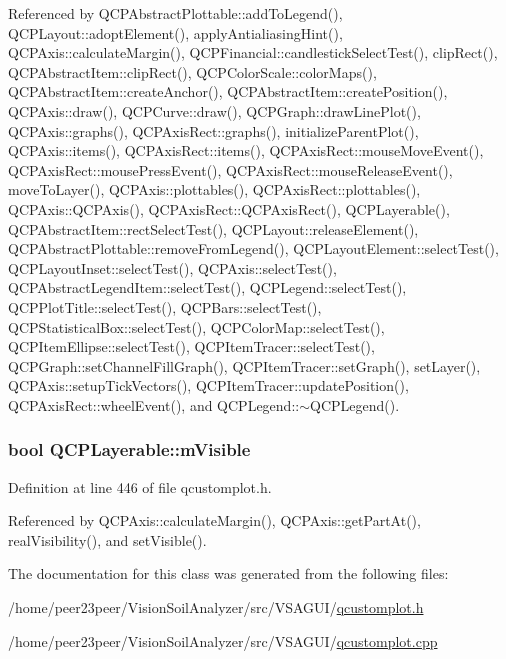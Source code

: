 Referenced by Q\+C\+P\+Abstract\+Plottable\+::add\+To\+Legend(), Q\+C\+P\+Layout\+::adopt\+Element(), apply\+Antialiasing\+Hint(), Q\+C\+P\+Axis\+::calculate\+Margin(), Q\+C\+P\+Financial\+::candlestick\+Select\+Test(), clip\+Rect(), Q\+C\+P\+Abstract\+Item\+::clip\+Rect(), Q\+C\+P\+Color\+Scale\+::color\+Maps(), Q\+C\+P\+Abstract\+Item\+::create\+Anchor(), Q\+C\+P\+Abstract\+Item\+::create\+Position(), Q\+C\+P\+Axis\+::draw(), Q\+C\+P\+Curve\+::draw(), Q\+C\+P\+Graph\+::draw\+Line\+Plot(), Q\+C\+P\+Axis\+::graphs(), Q\+C\+P\+Axis\+Rect\+::graphs(), initialize\+Parent\+Plot(), Q\+C\+P\+Axis\+::items(), Q\+C\+P\+Axis\+Rect\+::items(), Q\+C\+P\+Axis\+Rect\+::mouse\+Move\+Event(), Q\+C\+P\+Axis\+Rect\+::mouse\+Press\+Event(), Q\+C\+P\+Axis\+Rect\+::mouse\+Release\+Event(), move\+To\+Layer(), Q\+C\+P\+Axis\+::plottables(), Q\+C\+P\+Axis\+Rect\+::plottables(), Q\+C\+P\+Axis\+::\+Q\+C\+P\+Axis(), Q\+C\+P\+Axis\+Rect\+::\+Q\+C\+P\+Axis\+Rect(), Q\+C\+P\+Layerable(), Q\+C\+P\+Abstract\+Item\+::rect\+Select\+Test(), Q\+C\+P\+Layout\+::release\+Element(), Q\+C\+P\+Abstract\+Plottable\+::remove\+From\+Legend(), Q\+C\+P\+Layout\+Element\+::select\+Test(), Q\+C\+P\+Layout\+Inset\+::select\+Test(), Q\+C\+P\+Axis\+::select\+Test(), Q\+C\+P\+Abstract\+Legend\+Item\+::select\+Test(), Q\+C\+P\+Legend\+::select\+Test(), Q\+C\+P\+Plot\+Title\+::select\+Test(), Q\+C\+P\+Bars\+::select\+Test(), Q\+C\+P\+Statistical\+Box\+::select\+Test(), Q\+C\+P\+Color\+Map\+::select\+Test(), Q\+C\+P\+Item\+Ellipse\+::select\+Test(), Q\+C\+P\+Item\+Tracer\+::select\+Test(), Q\+C\+P\+Graph\+::set\+Channel\+Fill\+Graph(), Q\+C\+P\+Item\+Tracer\+::set\+Graph(), set\+Layer(), Q\+C\+P\+Axis\+::setup\+Tick\+Vectors(), Q\+C\+P\+Item\+Tracer\+::update\+Position(), Q\+C\+P\+Axis\+Rect\+::wheel\+Event(), and Q\+C\+P\+Legend\+::$\sim$\+Q\+C\+P\+Legend().

\hypertarget{class_q_c_p_layerable_a62e3aed8427d6ce3ccf716f285106cb3}{}
\subsubsection[{m\+Visible}]{\setlength{\rightskip}{0pt plus 5cm}bool Q\+C\+P\+Layerable\+::m\+Visible\hspace{0.3cm}{\ttfamily [protected]}}\label{class_q_c_p_layerable_a62e3aed8427d6ce3ccf716f285106cb3}


Definition at line 446 of file qcustomplot.\+h.



Referenced by Q\+C\+P\+Axis\+::calculate\+Margin(), Q\+C\+P\+Axis\+::get\+Part\+At(), real\+Visibility(), and set\+Visible().



The documentation for this class was generated from the following files\+:\begin{DoxyCompactItemize}
\item 
/home/peer23peer/\+Vision\+Soil\+Analyzer/src/\+V\+S\+A\+G\+U\+I/\hyperlink{qcustomplot_8h}{qcustomplot.\+h}\item 
/home/peer23peer/\+Vision\+Soil\+Analyzer/src/\+V\+S\+A\+G\+U\+I/\hyperlink{qcustomplot_8cpp}{qcustomplot.\+cpp}\end{DoxyCompactItemize}

